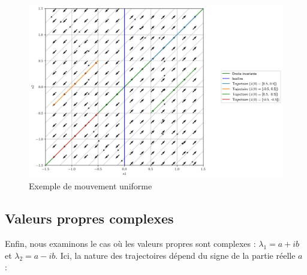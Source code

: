 \begin{itemize}
\begin{figure}[ht!]
                    \centering
                    \includegraphics[width=\textwidth]{images/mouvement_uniforme.jpg}
                    \caption{Exemple de mouvement uniforme}
                    \label{fig:mouvement_uniforme}
                \end{figure}
            \end{itemize}

        \subsection{Valeurs propres complexes}
            Enfin, nous examinons le cas où les valeurs propres sont complexes : $\lambda_1 = a + ib$ et $\lambda_2 = a - ib$. Ici, la nature des trajectoires dépend du signe de la partie réelle $a$ :
            
